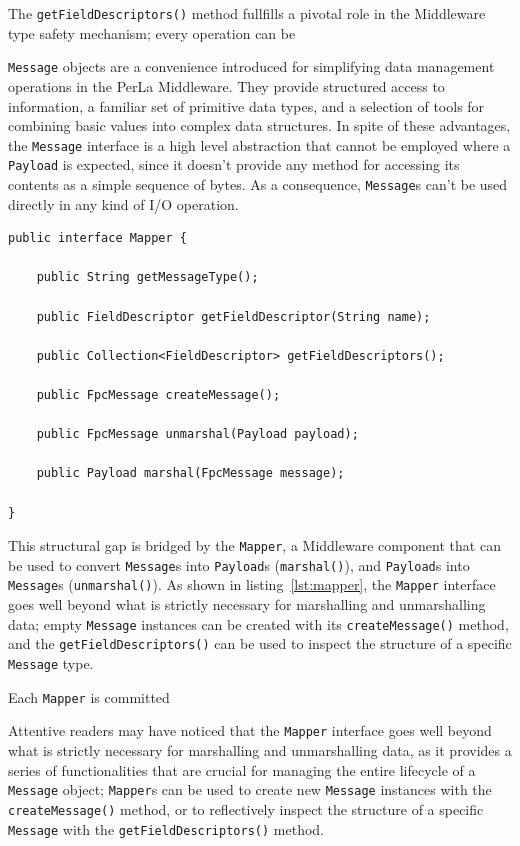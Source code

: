 The \texttt{getFieldDescriptors()} method fullfills a pivotal role in the
Middleware type safety mechanism; every
operation can be 


\texttt{Message} objects are a convenience introduced for simplifying data
management operations in the PerLa Middleware. They provide structured access
to information, a familiar set of primitive data types, and a selection of
tools for combining basic values into complex data structures. In spite of
these advantages, the \texttt{Message} interface is a high level abstraction
that cannot be employed where a \texttt{Payload} is expected, since it doesn't
provide any method for accessing its contents as a simple sequence of bytes.
As a consequence, \texttt{Message}s can't be used directly in any kind of I/O
operation.

\lstset{language=Java}
\begin{lstlisting}[float,floatplacement=!hbt,caption=The Mapper
interface,label={lst:mapper}]
public interface Mapper {

    public String getMessageType();

    public FieldDescriptor getFieldDescriptor(String name);

    public Collection<FieldDescriptor> getFieldDescriptors();

    public FpcMessage createMessage();

    public FpcMessage unmarshal(Payload payload);

    public Payload marshal(FpcMessage message);

}
\end{lstlisting}

This structural gap is bridged by the \texttt{Mapper}, a Middleware component
that can be used to convert \texttt{Message}s into \texttt{Payload}s
(\texttt{marshal()}), and \texttt{Payload}s into \texttt{Message}s
(\texttt{unmarshal()}). As shown in listing~\ref{lst:mapper}, the
\texttt{Mapper} interface goes well beyond what is strictly necessary for
marshalling and unmarshalling data; empty \texttt{Message} instances can be
created with its \texttt{createMessage()} method, and the
\texttt{getFieldDescriptors()} can be used to inspect the structure of a
specific \texttt{Message} type.

Each \texttt{Mapper} is committed


Attentive readers may have noticed that the \texttt{Mapper} interface goes well
beyond what is strictly necessary for marshalling and unmarshalling data, as it
provides a series of functionalities that are crucial for managing the entire
lifecycle of a \texttt{Message} object; \texttt{Mapper}s can be used to create
new \texttt{Message} instances with the \texttt{createMessage()} method, or to
reflectively inspect the structure of a specific \texttt{Message} with the
\texttt{getFieldDescriptors()} method.

